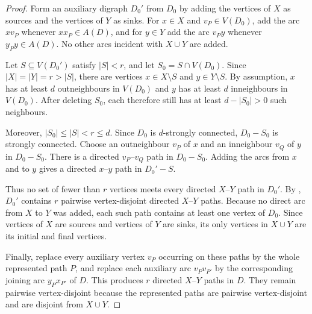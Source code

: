 \documentclass[11pt,a4paper]{article}
\theoremstyle{remark}
\numberwithin{equation}{section}
\begin{document}
	\begin{proof}
		Form an auxiliary digraph $D_0'$ from $D_0$ by adding the vertices of $X$
		as sources and the vertices of $Y$ as sinks.
		For $x\in X$ and $v_P\in V(D_0)$, add the arc $xv_P$ whenever
		$xx_P\in A(D)$, and for $y\in Y$ add the arc $v_Py$ whenever
		$y_Py\in A(D)$.
		No other arcs incident with $X\cup Y$ are added.
		
		Let $S\subseteq V(D_0')$ satisfy $|S|<r$, and let
		$
		S_0=S\cap V(D_0).
		$
		Since $|X|=|Y|=r>|S|$, there are vertices
		$x\in X\setminus S$ and
		$y\in Y\setminus S.$
		By assumption, $x$ has at least $d$ outneighbours in $V(D_0)$
		and $y$ has at least $d$ inneighbours in $V(D_0)$.
		After deleting $S_0$, each therefore still has at least
		$
		d-|S_0|>0
		$
		such neighbours.
		
		Moreover,
		$
		|S_0|\le |S|<r\le d.
		$
		Since $D_0$ is $d$-strongly connected, $D_0-S_0$ is strongly
		connected.
		Choose an outneighbour $v_P$ of $x$ and an inneighbour $v_Q$
		of $y$ in $D_0-S_0$.
		There is a directed $v_P$--$v_Q$ path in $D_0-S_0$.
		Adding the arcs from $x$ and to $y$ gives a directed
		$x$--$y$ path in $D_0'-S$.
		
		Thus no set of fewer than $r$ vertices meets every directed
		$X$--$Y$ path in $D_0'$.
		By , $D_0'$ contains
		$r$ pairwise vertex-disjoint directed $X$--$Y$ paths.
		Because no direct arc from $X$ to $Y$ was added, each such path
		contains at least one vertex of $D_0$.
		Since vertices of $X$ are sources and vertices of $Y$ are
		sinks, its only vertices in $X\cup Y$ are its initial and final
		vertices.
		
		Finally, replace every auxiliary vertex $v_P$ occurring on
		these paths by the whole represented path $P$, and replace each
		auxiliary arc $v_Pv_{P'}$ by the corresponding joining arc
		$y_Px_{P'}$ of $D$.
		This produces $r$ directed $X$--$Y$ paths in $D$.
		They remain pairwise vertex-disjoint because the represented
		paths are pairwise vertex-disjoint and are disjoint from
		$X\cup Y$.
	\end{proof}
	
\end{document}
